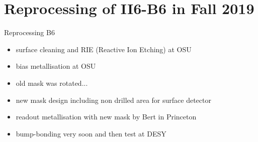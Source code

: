 \section{Reprocessing of II6-B6 in Fall 2019}
\begin{frame}{Reprocessing B6}

	\begin{itemize}\itemfill
		\item surface cleaning and RIE (Reactive Ion Etching) at OSU
		\item bias metallisation at OSU
		\item old mask was rotated...
	\end{itemize}
	
	
	
	\begin{itemize}
      \item new mask design including non drilled area for surface detector
      \item readout metallisation with new mask by Bert in Princeton
      \item bump-bonding very soon and then test at DESY 
    \end{itemize}

	
\end{frame}

